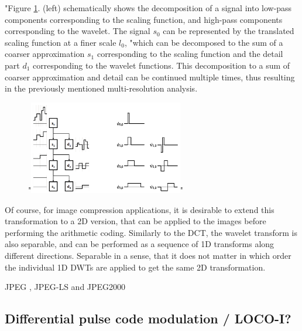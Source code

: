       "Figure \ref{fig:wavelet}. (left) schematically shows the decomposition of a signal into low-pass components corresponding to the scaling function, and high-pass components corresponding to the wavelet. The signal $s_0$ can be represented by the translated scaling function at a finer scale $l_0$, "which can be decomposed to the sum of a coarser approximation $s_1$ corresponding to the scaling function and the detail part $d_1$ corresponding to the wavelet functions. This decomposition to a sum of coarser approximation and detail can be continued multiple times, thus resulting in the previously mentioned multi-resolution analysis.


      \begin{figure}
        \centering
        "\includegraphics[width=0.6\textwidth]{wavelet}"
        \label{fig:wavelet}
      \end{figure}


      Of course, for image compression applications, it is desirable to extend this transformation to a 2D version, that can be applied to the images before performing the arithmetic coding. Similarly to the DCT, the wavelet transform is also separable, and can be performed as a sequence of 1D transforms along different directions. Separable in a sense, that it does not matter in which order the individual 1D DWTs are applied to get the same 2D transformation.

      JPEG \cite{pennebaker_jpeg:_1992}, JPEG-LS \cite{weinberger_loco-i_2000} and JPEG2000 \cite{adams_jpeg-2000_2001}
      


  \subsection{Differential pulse code modulation / LOCO-I?}

